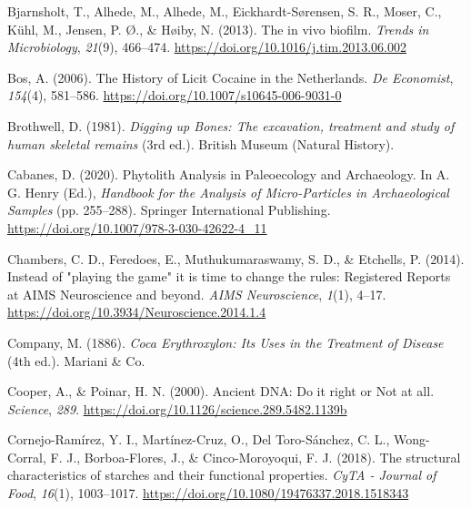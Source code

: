 \documentclass[
  b5paper,
]{book}
\newlength{\cslhangindent}
\newlength{\cslentryspacingunit} %
\newenvironment{CSLReferences}[2] %
 {%
  \setlength{\parindent}{0pt}
  \ifodd #1
  \let\oldpar\par
  \def\par{\hangindent=\cslhangindent\oldpar}
  \fi
  \setlength{\parskip}{#2\cslentryspacingunit}
 }%
 {}
\begin{document}
\begin{CSLReferences}{1}{0}
\leavevmode{}%
Bjarnsholt, T., Alhede, M., Alhede, M., Eickhardt-Sørensen, S. R.,
Moser, C., Kühl, M., Jensen, P. Ø., \& Høiby, N. (2013). The in vivo
biofilm. \emph{Trends in Microbiology}, \emph{21}(9), 466--474.
\url{https://doi.org/10.1016/j.tim.2013.06.002}

\leavevmode{}%
Bos, A. (2006). The {History} of {Licit Cocaine} in the {Netherlands}.
\emph{De Economist}, \emph{154}(4), 581--586.
\url{https://doi.org/10.1007/s10645-006-9031-0}

\leavevmode{}%
Brothwell, D. (1981). \emph{Digging up {Bones}: {The} excavation,
treatment and study of human skeletal remains} (3rd ed.). {British
Museum (Natural History)}.

\leavevmode{}%
Cabanes, D. (2020). Phytolith {Analysis} in {Paleoecology} and
{Archaeology}. In A. G. Henry (Ed.), \emph{Handbook for the {Analysis}
of {Micro-Particles} in {Archaeological Samples}} (pp. 255--288).
{Springer International Publishing}.
\url{https://doi.org/10.1007/978-3-030-42622-4_11}

\leavevmode{}%
Chambers, C. D., Feredoes, E., Muthukumaraswamy, S. D., \& Etchells, P.
(2014). Instead of "playing the game" it is time to change the rules:
{Registered Reports} at {AIMS Neuroscience} and beyond. \emph{AIMS
Neuroscience}, \emph{1}(1), 4--17.
\url{https://doi.org/10.3934/Neuroscience.2014.1.4}

\leavevmode{}%
Company, M. (1886). \emph{Coca {Erythroxylon}: {Its Uses} in the
{Treatment} of {Disease}} (4th ed.). {Mariani \& Co.}

\leavevmode{}%
Cooper, A., \& Poinar, H. N. (2000). Ancient {DNA}: {Do} it right or
{Not} at all. \emph{Science}, \emph{289}.
\url{https://doi.org/10.1126/science.289.5482.1139b}

\leavevmode{}%
Cornejo-Ramírez, Y. I., Martínez-Cruz, O., Del Toro-Sánchez, C. L.,
Wong-Corral, F. J., Borboa-Flores, J., \& Cinco-Moroyoqui, F. J. (2018).
The structural characteristics of starches and their functional
properties. \emph{CyTA - Journal of Food}, \emph{16}(1), 1003--1017.
\url{https://doi.org/10.1080/19476337.2018.1518343}


\end{CSLReferences}
\end{document}
